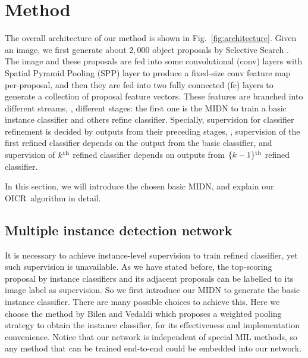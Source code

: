 \documentclass[10pt,twocolumn,letterpaper]{article}
\def\methodname{OICR}
\begin{document}
\section{Method}
\label{sec:method}

The overall architecture of our method is shown in Fig.~\ref{fig:architecture}.
Given an image, we first generate about $2,000$ object proposals by Selective Search \cite{Ref:Uijlings2013}.
The image and these proposals are fed into some convolutional (conv) layers with Spatial Pyramid Pooling (SPP) layer \cite{Ref:He2015} %
to produce a fixed-size conv feature map per-proposal,
and then they are fed into two fully connected (fc) layers to generate a collection of proposal feature vectors.
These features are branched into different streams, \ie, different stages: the first one is the MIDN to train a basic instance classifier and others refine classifier.
Specially, supervision for classifier refinement is decided by outputs from their preceding stages, \eg, supervision of the first refined classifier depends on the output from the basic classifier, and supervision of $k^{\textup{th}}$ refined classifier depends on outputs from $\{k-1\}^{\textup{th}}$ refined classifier.

In this section, we will introduce the chosen basic MIDN, and explain our \methodname\ algorithm in detail.


\subsection{Multiple instance detection network}
\label{sec:midn}

It is necessary to achieve instance-level supervision to train refined classifier, yet such supervision is unavailable.
As we have stated before, the top-scoring proposal by instance classifiers and its adjacent proposals can be labelled to its image label as supervision.
So we first introduce our MIDN to generate the basic instance classifier.
There are many possible choices \cite{Ref:Bilen2016,Ref:Cibis2017,Ref:Kantorov2016,Ref:Wang2015} to achieve this.
Here we choose the method by Bilen and Vedaldi \cite{Ref:Bilen2016} which proposes a weighted pooling strategy to obtain the instance classifier, for its effectiveness and implementation convenience.
Notice that our network is independent of special MIL methods, so any method that can be trained end-to-end could be embedded into our network.
\end{document}

